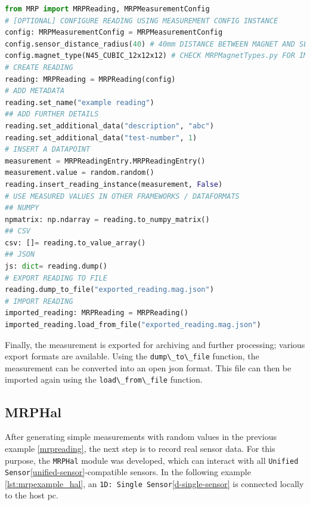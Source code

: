 \begin{lstlisting}[language=Python, caption={MRPReading example for setting up an basic measurement}, label=lst:mrpexample_reading]
from MRP import MRPReading, MRPMeasurementConfig
# [OPTIONAL] CONFIGURE READING USING MEASUREMENT CONFIG INSTANCE
config: MRPMeasurementConfig = MRPMeasurementConfig
config.sensor_distance_radius(40) # 40mm DISTANCE BETWEEN MAGNET AND SENSOR
config.magnet_type(N45_CUBIC_12x12x12) # CHECK MRPMagnetTypes.py FOR IMPLEMENTED TYPES
# CREATE READING
reading: MRPReading = MRPReading(config)
# ADD METADATA
reading.set_name("example reading")
## ADD FURTHER DETAILS
reading.set_additional_data("description", "abc")
reading.set_additional_data("test-number", 1)
# INSERT A DATAPOINT
measurement = MRPReadingEntry.MRPReadingEntry()
measurement.value = random.random()
reading.insert_reading_instance(measurement, False)
# USE MEASURED VALUES IN OTHER FRAMEWORKS / DATAFORMATS
## NUMPY
npmatrix: np.ndarray = reading.to_numpy_matrix()
## CSV
csv: []= reading.to_value_array()
## JSON
js: dict= reading.dump()
# EXPORT READING TO FILE
reading.dump_to_file("exported_reading.mag.json")
# IMPORT READING
imported_reading: MRPReading = MRPReading()
imported_reading.load_from_file("exported_reading.mag.json")
\end{lstlisting}

Finally, the measurement is exported for archiving and further
processing; various export formats are available. Using the
\passthrough{\lstinline!dump\_to\_file!} function, the measurement can
be converted into an open \gls{json} format. This file can then be
imported again using the \passthrough{\lstinline!load\_from\_file!}
function.

\hypertarget{mrphal}{%
\subsection{MRPHal}\label{mrphal}}

After generating simple measurements with random values in the previous
example \ref{mrpreading}, the next step is to record real sensor data.
For this purpose, the \passthrough{\lstinline!MRPHal!} module was
developed, which can interact with all
\passthrough{\lstinline!Unified Sensor!}\ref{unified-sensor}-compatible
sensors. In the following example \ref{lst:mrpexample_hal}, an
\passthrough{\lstinline!1D: Single Sensor!}\ref{d-single-sensor} is
connected locally to the host \gls{pc}.

